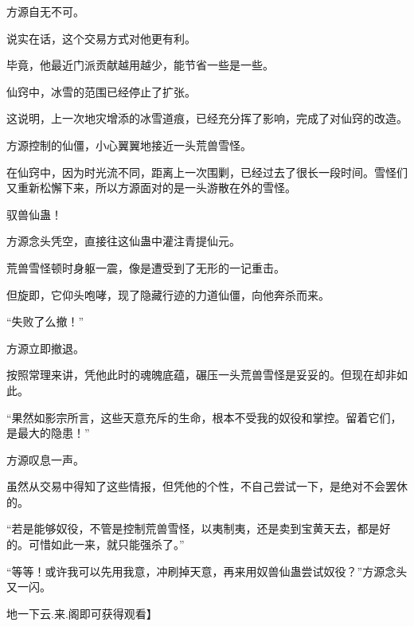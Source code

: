 \begin{this_body}
方源自无不可。

说实在话，这个交易方式对他更有利。

毕竟，他最近门派贡献越用越少，能节省一些是一些。

仙窍中，冰雪的范围已经停止了扩张。

这说明，上一次地灾增添的冰雪道痕，已经充分挥了影响，完成了对仙窍的改造。

方源控制的仙僵，小心翼翼地接近一头荒兽雪怪。

在仙窍中，因为时光流不同，距离上一次围剿，已经过去了很长一段时间。雪怪们又重新松懈下来，所以方源面对的是一头游散在外的雪怪。

驭兽仙蛊！

方源念头凭空，直接往这仙蛊中灌注青提仙元。

荒兽雪怪顿时身躯一震，像是遭受到了无形的一记重击。

但旋即，它仰头咆哮，现了隐藏行迹的力道仙僵，向他奔杀而来。

“失败了么撤！”

方源立即撤退。

按照常理来讲，凭他此时的魂魄底蕴，碾压一头荒兽雪怪是妥妥的。但现在却非如此。

“果然如影宗所言，这些天意充斥的生命，根本不受我的奴役和掌控。留着它们，是最大的隐患！”

方源叹息一声。

虽然从交易中得知了这些情报，但凭他的个性，不自己尝试一下，是绝对不会罢休的。

“若是能够奴役，不管是控制荒兽雪怪，以夷制夷，还是卖到宝黄天去，都是好的。可惜如此一来，就只能强杀了。”

“等等！或许我可以先用我意，冲刷掉天意，再来用奴兽仙蛊尝试奴役？”方源念头又一闪。

地一下云.来.阁即可获得观看】

\end{this_body}


